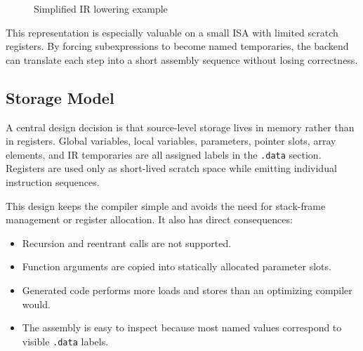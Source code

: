 \documentclass[12pt]{report}
\begin{document}
\begin{figure}[!htbp]
\centering
{}
\caption{Simplified IR lowering example}
\label{fig:ir-lowering}
\end{figure}

This representation is especially valuable on a small ISA with limited scratch
registers. By forcing subexpressions to become named temporaries, the backend
can translate each step into a short assembly sequence without losing
correctness.

\subsection{Storage Model}

A central design decision is that source-level storage lives in memory rather
than in registers. Global variables, local variables, parameters, pointer
slots, array elements, and IR temporaries are all assigned labels in the
\texttt{.data} section. Registers are used only as short-lived scratch space
while emitting individual instruction sequences.

This design keeps the compiler simple and avoids the need for stack-frame
management or register allocation. It also has direct consequences:

\begin{itemize}
    \item Recursion and reentrant calls are not supported.
    \item Function arguments are copied into statically allocated parameter
          slots.
    \item Generated code performs more loads and stores than an optimizing
          compiler would.
    \item The assembly is easy to inspect because most named values correspond
          to visible \texttt{.data} labels.
\end{itemize}
\end{document}
